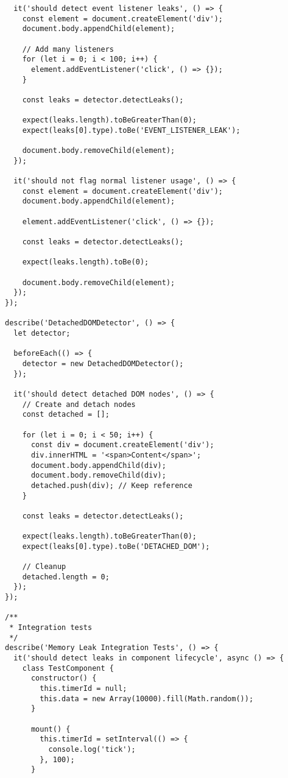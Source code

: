\documentclass[11pt]{article}
\begin{document}
\begin{verbatim}
  it('should detect event listener leaks', () => {
    const element = document.createElement('div');
    document.body.appendChild(element);
    
    // Add many listeners
    for (let i = 0; i < 100; i++) {
      element.addEventListener('click', () => {});
    }
    
    const leaks = detector.detectLeaks();
    
    expect(leaks.length).toBeGreaterThan(0);
    expect(leaks[0].type).toBe('EVENT_LISTENER_LEAK');
    
    document.body.removeChild(element);
  });
  
  it('should not flag normal listener usage', () => {
    const element = document.createElement('div');
    document.body.appendChild(element);
    
    element.addEventListener('click', () => {});
    
    const leaks = detector.detectLeaks();
    
    expect(leaks.length).toBe(0);
    
    document.body.removeChild(element);
  });
});

describe('DetachedDOMDetector', () => {
  let detector;
  
  beforeEach(() => {
    detector = new DetachedDOMDetector();
  });
  
  it('should detect detached DOM nodes', () => {
    // Create and detach nodes
    const detached = [];
    
    for (let i = 0; i < 50; i++) {
      const div = document.createElement('div');
      div.innerHTML = '<span>Content</span>';
      document.body.appendChild(div);
      document.body.removeChild(div);
      detached.push(div); // Keep reference
    }
    
    const leaks = detector.detectLeaks();
    
    expect(leaks.length).toBeGreaterThan(0);
    expect(leaks[0].type).toBe('DETACHED_DOM');
    
    // Cleanup
    detached.length = 0;
  });
});

/**
 * Integration tests
 */
describe('Memory Leak Integration Tests', () => {
  it('should detect leaks in component lifecycle', async () => {
    class TestComponent {
      constructor() {
        this.timerId = null;
        this.data = new Array(10000).fill(Math.random());
      }
      
      mount() {
        this.timerId = setInterval(() => {
          console.log('tick');
        }, 100);
      }
      

\end{verbatim}
\end{document}
